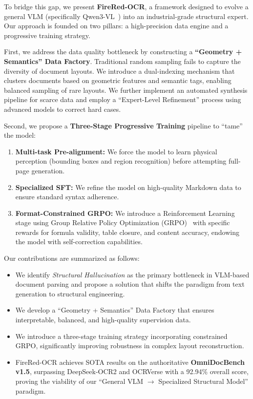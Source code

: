 To bridge this gap, we present \textbf{FireRed-OCR}, a framework designed to evolve a general VLM (specifically Qwen3-VL~\cite{bai2025qwen3}) into an industrial-grade structural expert. Our approach is founded on two pillars: a high-precision data engine and a progressive training strategy.

First, we address the data quality bottleneck by constructing a \textbf{``Geometry + Semantics'' Data Factory}. Traditional random sampling fails to capture the diversity of document layouts. We introduce a dual-indexing mechanism that clusters documents based on geometric features and semantic tags, enabling balanced sampling of rare layouts. We further implement an automated synthesis pipeline for scarce data and employ a ``Expert-Level Refinement'' process using advanced models to correct hard cases.

Second, we propose a \textbf{Three-Stage Progressive Training} pipeline to ``tame'' the model:
\begin{enumerate}
    \item \textbf{Multi-task Pre-alignment:} We force the model to learn physical perception (bounding boxes and region recognition) before attempting full-page generation.
    \item \textbf{Specialized SFT:} We refine the model on high-quality Markdown data to ensure standard syntax adherence.
    \item \textbf{Format-Constrained GRPO:} We introduce a Reinforcement Learning stage using Group Relative Policy Optimization (GRPO)~\cite{shao2024deepseekmath} with specific rewards for formula validity, table closure, and content accuracy, endowing the model with self-correction capabilities.
\end{enumerate}

Our contributions are summarized as follows:
\begin{itemize}
    \item We identify \textit{Structural Hallucination} as the primary bottleneck in VLM-based document parsing and propose a solution that shifts the paradigm from text generation to structural engineering.
    \item We develop a ``Geometry + Semantics'' Data Factory that ensures interpretable, balanced, and high-quality supervision data.
    \item We introduce a three-stage training strategy incorporating constrained GRPO, significantly improving robustness in complex layout reconstruction.
    \item FireRed-OCR achieves SOTA results on the authoritative \textbf{OmniDocBench v1.5}, surpassing DeepSeek-OCR2 and OCRVerse with a 92.94\% overall score, proving the viability of our ``General VLM $\rightarrow$ Specialized Structural Model'' paradigm.
\end{itemize}